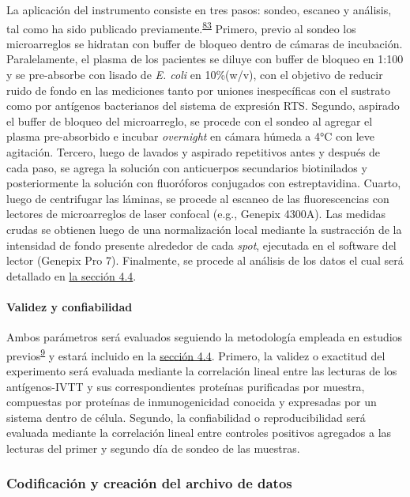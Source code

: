 \documentclass[]{article}
\let\oldparagraph\paragraph
\renewcommand{\paragraph}[1]{\oldparagraph{#1}\mbox{}}
\begin{document}
La aplicación del instrumento consiste en tres pasos: sondeo, escaneo y
análisis, tal como ha sido publicado
previamente.\textsuperscript{\protect\hyperlink{ref-Driguez2015}{83}}
Primero, previo al sondeo los microarreglos se hidratan con buffer de
bloqueo dentro de cámaras de incubación. Paralelamente, el plasma de los
pacientes se diluye con buffer de bloqueo en 1:100 y se pre-absorbe con
lisado de \emph{E. coli} en 10\%(w/v), con el objetivo de reducir ruido
de fondo en las mediciones tanto por uniones inespecíficas con el
sustrato como por antígenos bacterianos del sistema de expresión RTS.
Segundo, aspirado el buffer de bloqueo del microarreglo, se procede con
el sondeo al agregar el plasma pre-absorbido e incubar \emph{overnight}
en cámara húmeda a 4°C con leve agitación. Tercero, luego de lavados y
aspirado repetitivos antes y después de cada paso, se agrega la solución
con anticuerpos secundarios biotinilados y posteriormente la solución
con fluoróforos conjugados con estreptavidina. Cuarto, luego de
centrifugar las láminas, se procede al escaneo de las fluorescencias con
lectores de microarreglos de laser confocal (e.g., Genepix 4300A). Las
medidas crudas se obtienen luego de una normalización local mediante la
sustracción de la intensidad de fondo presente alrededor de cada
\emph{spot}, ejecutada en el software del lector (Genepix Pro 7).
Finalmente, se procede al análisis de los datos el cual será detallado
en \protect\hyperlink{procanal}{la sección 4.4}.

\hypertarget{validez}{\paragraph{Validez y
confiabilidad}\label{validez}}

Ambos parámetros será evaluados seguiendo la metodología empleada en
estudios
previos\textsuperscript{\protect\hyperlink{ref-crompton2010}{9}} y
estará incluido en la \protect\hyperlink{procanal}{sección 4.4}.
Primero, la validez o exactitud del experimento será evaluada mediante
la correlación lineal entre las lecturas de los antígenos-IVTT y sus
correspondientes proteínas purificadas por muestra, compuestas por
proteínas de inmunogenicidad conocida y expresadas por un sistema dentro
de célula. Segundo, la confiabilidad o reproducibilidad será evaluada
mediante la correlación lineal entre controles positivos agregados a las
lecturas del primer y segundo día de sondeo de las muestras.

\subsubsection{Codificación y creación del archivo de
datos}\label{codificacion-y-creacion-del-archivo-de-datos}
\end{document}
